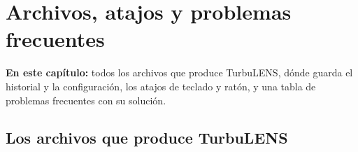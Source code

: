 \chapter{Archivos, atajos y problemas frecuentes}\label{cap:archivos}

\begin{resumen}
\textbf{En este capítulo:} todos los archivos que produce TurbuLENS, dónde guarda el historial y la configuración, los
atajos de teclado y ratón, y una tabla de problemas frecuentes con su solución.
\end{resumen}

\section{Los archivos que produce TurbuLENS}

